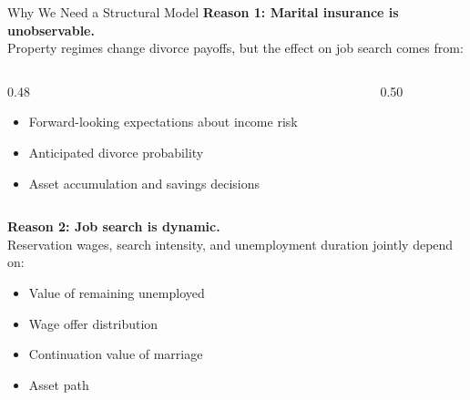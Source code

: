 \documentclass[aspectratio=169, 11pt]{beamer}
\newcommand{\B}[1]{\textcolor{dutch}{\textbf{#1}}}
\begin{document}
\begin{frame}{Why We Need a Structural Model}
\textbf{Reason 1: Marital insurance is unobservable.}\\[0.3em]
Property regimes change divorce payoffs, but the effect on job search comes from:
\begin{columns}[T]
\begin{column}{0.48\textwidth}
\begin{itemize}
  \item Forward-looking expectations about income risk
  \item Anticipated divorce probability
  \item Asset accumulation and savings decisions
\end{itemize}
\end{column}
\begin{column}{0.50\textwidth}
\end{column}
\end{columns}
\vspace{1.5em}
\textbf{Reason 2: Job search is dynamic.}\\[0.3em]
Reservation wages, search intensity, and unemployment duration jointly depend on:
\begin{itemize}
  \item Value of remaining unemployed
  \vspace{0.1cm}
  \item Wage offer distribution
  \vspace{0.1cm}
  \item Continuation value of marriage
  \vspace{0.1cm}
  \item Asset path
\end{itemize}
\end{frame}
\end{document}
